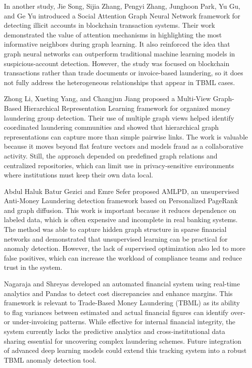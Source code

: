 In another study, Jie Song, Sijia Zhang, Pengyi Zhang, Junghoon Park, Yu Gu, and Ge Yu \cite{Illicit2025} introduced a Social Attention Graph Neural Network framework for detecting illicit accounts in blockchain transaction systems. Their work demonstrated the value of attention mechanisms in highlighting the most informative neighbors during graph learning. It also reinforced the idea that graph neural networks can outperform traditional machine learning models in suspicious-account detection. However, the study was focused on blockchain transactions rather than trade documents or invoice-based laundering, so it does not fully address the heterogeneous relationships that appear in TBML cases.

Zhong Li, Xueting Yang, and Changjun Jiang \cite{Li2025} proposed a Multi-View Graph-Based Hierarchical Representation Learning framework for organized money laundering group detection. Their use of multiple graph views helped identify coordinated laundering communities and showed that hierarchical graph representations can capture more than simple pairwise links. The work is valuable because it moves beyond flat feature vectors and models fraud as a collaborative activity. Still, the approach depended on predefined graph relations and centralized repositories, which can limit use in privacy-sensitive environments where institutions must keep their own data local.

Abdul Haluk Batur Gezici and Emre Sefer \cite{Gezici2025} proposed AMLPD, an unsupervised Anti-Money Laundering detection framework based on Personalized PageRank and graph diffusion. This work is important because it reduces dependence on labeled data, which is often expensive and incomplete in real banking systems. The method was able to capture hidden graph structure in sparse financial networks and demonstrated that unsupervised learning can be practical for anomaly detection. However, the lack of supervised optimization also led to more false positives, which can increase the workload of compliance teams and reduce trust in the system.

Nagaraja and Shreyas \cite{Nagaraja2024} developed an automated financial system using real-time analytics and Pandas to detect cost discrepancies and enhance margins. This framework is relevant to Trade-Based Money Laundering (TBML) as its ability to flag variances between estimated and actual financial figures can identify over- or under-invoicing patterns. While effective for internal financial integrity, the system currently lacks the predictive analytics and cross-institutional data sharing essential for uncovering complex laundering schemes. Future integration of advanced deep learning models could extend this tracking system into a robust TBML anomaly detection tool.


